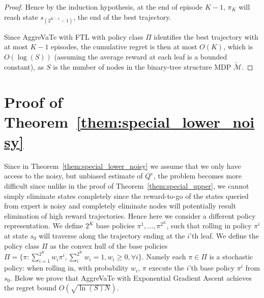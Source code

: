 \documentclass{article}
\begin{document}
\begin{proof}
Hence by the induction hypothesis, at the end of episode $K-1$, $\pi_{K}$ will reach state $s_{(2^{K-1}-1)}$, the end of the best trajectory.

Since AggreVaTe with FTL with policy class $\Pi$ identifies the best trajectory with at most $K-1$ episodes, the cumulative regret is then at most $O(K)$, which is $O(\log(S))$ (assuming the average reward at each leaf is a bounded constant), as $S$ is the number of nodes in the binary-tree structure MDP $\tilde{\mathcal{M}}$.
\end{proof}


\section{Proof of Theorem~\ref{them:special_lower_noisy}}
\label{sec:proof_special_noisy}
Since in Theorem~\ref{them:special_lower_noisy} we assume that we only have access to the noisy, but unbiased estimate of $Q^e$, the problem becomes more difficult since unlike in the proof of Theorem~\ref{them:special_upper}, we cannot simply eliminate states completely since the reward-to-go of the states queried from expert is noisy and completely eliminate nodes will potentially result elimination of high reward trajectories.  Hence here we consider a different policy representation. We define $2^{K}$ base policies $\pi^1, ..., \pi^{2^K}$, such that rolling in policy $\pi^i$ at state $s_0$ will traverse along the trajectory ending at the $i$'th leaf. We define the policy class $\Pi$ as the convex hull of the base policies $\Pi = \{\pi: \sum_{i=1}^{2^K}w_i\pi^i, \sum_i^{2^K}w_i = 1, w_i\geq 0, \forall i\}$. Namely each $\pi\in\Pi$ is a stochastic policy: when rolling in, with probability $w_i$, $\pi$ execute the $i$'th base policy $\pi^i$ from $s_0$. Below we prove that AggreVaTe with Exponential Gradient Ascent achieves the regret bound $O(\sqrt{\ln(S) N})$.
\end{document}

